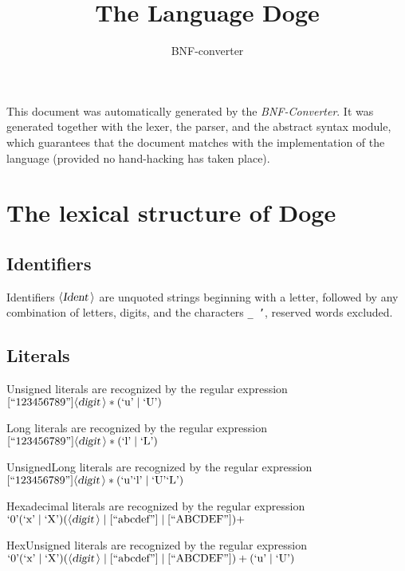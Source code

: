 \documentclass[a4paper,11pt]{article}
\author{BNF-converter}
\title{The Language Doge}
\begin{document}
\maketitle

\newcommand{\emptyP}{\mbox{$\epsilon$}}
\newcommand{\terminal}[1]{\mbox{{\texttt {#1}}}}
\newcommand{\nonterminal}[1]{\mbox{$\langle \mbox{{\sl #1 }} \! \rangle$}}
\newcommand{\arrow}{\mbox{::=}}
\newcommand{\delimit}{\mbox{$|$}}
\newcommand{\reserved}[1]{\mbox{{\texttt {#1}}}}
\newcommand{\literal}[1]{\mbox{{\texttt {#1}}}}
\newcommand{\symb}[1]{\mbox{{\texttt {#1}}}}

This document was automatically generated by the {\em BNF-Converter}. It was generated together with the lexer, the parser, and the abstract syntax module, which guarantees that the document matches with the implementation of the language (provided no hand-hacking has taken place).

\section*{The lexical structure of Doge}
\subsection*{Identifiers}
Identifiers \nonterminal{Ident} are unquoted strings beginning with a letter,
followed by any combination of letters, digits, and the characters {\tt \_ '},
reserved words excluded.


\subsection*{Literals}

Unsigned literals are recognized by the regular expression
\([\mbox{``123456789''}] {\nonterminal{digit}}* (\mbox{`u'} \mid \mbox{`U'})\)

Long literals are recognized by the regular expression
\([\mbox{``123456789''}] {\nonterminal{digit}}* (\mbox{`l'} \mid \mbox{`L'})\)

UnsignedLong literals are recognized by the regular expression
\([\mbox{``123456789''}] {\nonterminal{digit}}* (\mbox{`u'} \mbox{`l'} \mid \mbox{`U'} \mbox{`L'})\)

Hexadecimal literals are recognized by the regular expression
\(\mbox{`0'} (\mbox{`x'} \mid \mbox{`X'}) ({\nonterminal{digit}} \mid [\mbox{``abcdef''}] \mid [\mbox{``ABCDEF''}])+\)

HexUnsigned literals are recognized by the regular expression
\(\mbox{`0'} (\mbox{`x'} \mid \mbox{`X'}) ({\nonterminal{digit}} \mid [\mbox{``abcdef''}] \mid [\mbox{``ABCDEF''}])+ (\mbox{`u'} \mid \mbox{`U'})\)
\end{document}
